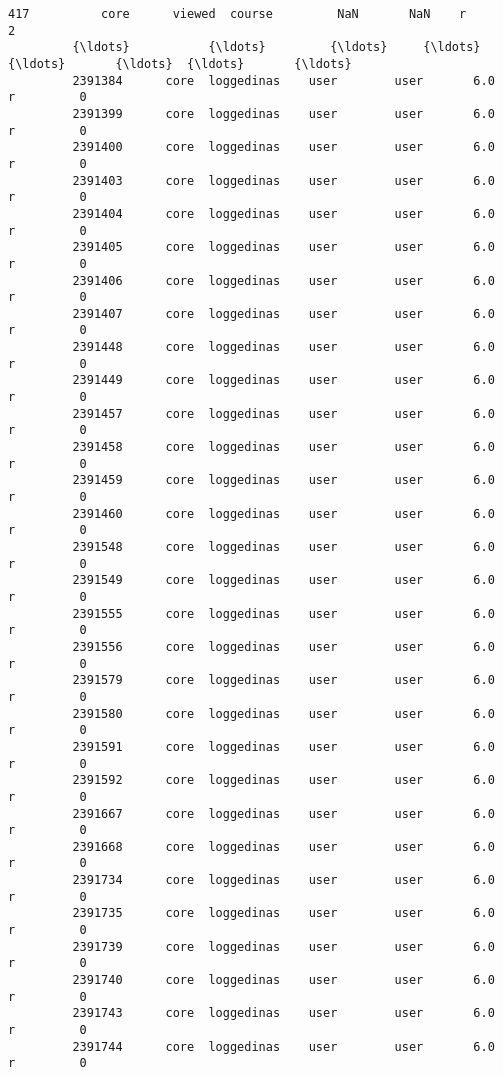 \documentclass[11pt]{article}
\begin{document}
\begin{Verbatim}[commandchars=\\\{\}]
         417          core      viewed  course         NaN       NaN    r         2   
         {\ldots}           {\ldots}         {\ldots}     {\ldots}         {\ldots}       {\ldots}  {\ldots}       {\ldots}   
         2391384      core  loggedinas    user        user       6.0    r         0   
         2391399      core  loggedinas    user        user       6.0    r         0   
         2391400      core  loggedinas    user        user       6.0    r         0   
         2391403      core  loggedinas    user        user       6.0    r         0   
         2391404      core  loggedinas    user        user       6.0    r         0   
         2391405      core  loggedinas    user        user       6.0    r         0   
         2391406      core  loggedinas    user        user       6.0    r         0   
         2391407      core  loggedinas    user        user       6.0    r         0   
         2391448      core  loggedinas    user        user       6.0    r         0   
         2391449      core  loggedinas    user        user       6.0    r         0   
         2391457      core  loggedinas    user        user       6.0    r         0   
         2391458      core  loggedinas    user        user       6.0    r         0   
         2391459      core  loggedinas    user        user       6.0    r         0   
         2391460      core  loggedinas    user        user       6.0    r         0   
         2391548      core  loggedinas    user        user       6.0    r         0   
         2391549      core  loggedinas    user        user       6.0    r         0   
         2391555      core  loggedinas    user        user       6.0    r         0   
         2391556      core  loggedinas    user        user       6.0    r         0   
         2391579      core  loggedinas    user        user       6.0    r         0   
         2391580      core  loggedinas    user        user       6.0    r         0   
         2391591      core  loggedinas    user        user       6.0    r         0   
         2391592      core  loggedinas    user        user       6.0    r         0   
         2391667      core  loggedinas    user        user       6.0    r         0   
         2391668      core  loggedinas    user        user       6.0    r         0   
         2391734      core  loggedinas    user        user       6.0    r         0   
         2391735      core  loggedinas    user        user       6.0    r         0   
         2391739      core  loggedinas    user        user       6.0    r         0   
         2391740      core  loggedinas    user        user       6.0    r         0   
         2391743      core  loggedinas    user        user       6.0    r         0   
         2391744      core  loggedinas    user        user       6.0    r         0   
         

\end{Verbatim}
\end{document}
